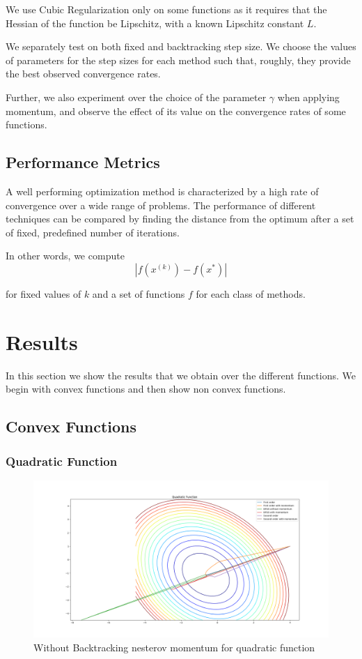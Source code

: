 \documentclass{article}
\begin{document}
We use Cubic Regularization only on some functions as it requires that the Hessian of the function be Lipschitz, with a known Lipschitz constant $L$.

We separately test on both fixed and backtracking step size. We choose the values of parameters for the step sizes for each method such that, roughly, they provide the best observed convergence rates.

Further, we also experiment over the choice of the parameter $\gamma$ when applying momentum, and observe the effect of its value on the convergence rates of some functions.

\subsection{Performance Metrics}
A well performing optimization method is characterized by a high rate of convergence over a wide range of problems. The performance of different techniques can be compared by finding the distance from the optimum after a set of fixed, predefined number of iterations.

In other words, we compute
\begin{equation}
|f(x^{(k)}) - f(x^*)|
\end{equation}

for fixed values of $k$ and a set of functions $f$ for each class of methods.

\section{Results}\label{results}
In this section we show the results that we obtain over the different functions. We begin with convex functions and then show non convex functions.

\subsection{Convex Functions}

\subsubsection{Quadratic Function}

\begin{figure}[H]
	\includegraphics[width=\linewidth]{../Images/quadraticnesterov.png}
	\caption{Without Backtracking nesterov momentum for quadratic function}
	\label{fig:Without Backtracking nesterov momentum for quadratic function}
\end{figure}
\end{document}
